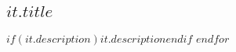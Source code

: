 \documentclass[$if(line_numbers)$
linenumbers,
$endif$
$if(double_spacing)$
doublespacing,
$endif$
$if(two_columns)$
twocolumn,
$endif$]{bmcart}
\begin{document}
\begin{backmatter}
  \subsection*{$it.title$}
  $if(it.description)$$it.description$$endif$
$endfor$

\end{backmatter}
\end{document}
